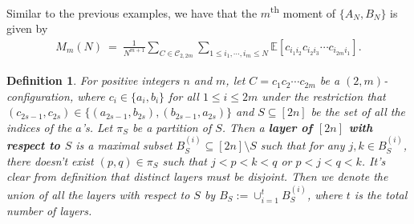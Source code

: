 \documentclass[11pt,reqno]{amsart}
\numberwithin{equation}{section}
\theoremstyle{plain}
\newtheorem{definition}[thm]{Definition}
\begin{document}
Similar to the previous examples, we have that the $m$\textsuperscript{th} moment of $\{A_N, B_N\}$ is given by
\begin{align}\label{expansionGOEPT}
M_m(N) \ = \ \frac{1}{N^{m+1}}\sum_{C\in\mathcal{C}_{2, 2m}}\sum_{1\leq i_1,\cdots, i_m\leq N}\mathbb{E}[c_{i_1i_2}c_{i_2i_3}\cdots c_{i_{2m}i_1}].
\end{align}




\begin{definition}
For positive integers $n$ and $m$, let $C=c_1c_2\cdots c_{2m}$ be a $(2, m)$-configuration, where $c_i\in\{a_i, b_i\}$ for all $1\leq i\leq 2m$ under the restriction that $(c_{2s-1},c_{2s})\in \{(a_{2s-1}, b_{2s}), (b_{2s-1}, a_{2s})\}$ and $S\subseteq [2n]$ be the set of all the indices of the $a$'s. Let $\pi_S$ be a partition of $S$. Then a \textbf{layer of $[2n]$ with respect to $S$} is a maximal subset $B^{(i)}_S\subseteq [2n]\setminus S$ such that for any $j, k\in B^{(i)}_S$, there doesn't exist $(p, q)\in \pi_S$ such that $j<p<k<q$ or $p<j<q<k$. It's clear from definition that distinct layers must be disjoint. Then we denote the union of all the layers with respect to $S$ by $B_S:=\cup_{i=1}^t B^{(i)}_S$, where $t$ is the total number of layers.
\end{definition}
\end{document}
